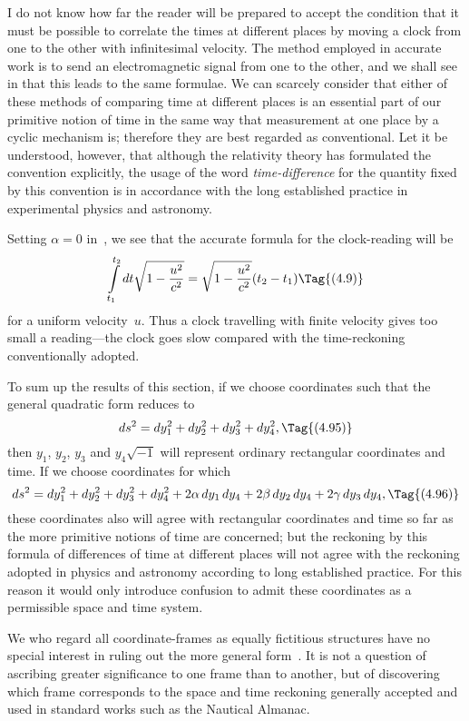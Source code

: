 \documentclass[12pt]{book}
\begin{document}
I do not know how far the reader will be prepared to accept the condition
that it must be possible to correlate the times at different places by moving
a clock from one to the other with infinitesimal velocity. The method
employed in accurate work is to send an electromagnetic signal from one to
the other, and we shall see in  that this leads to the same formulae. We
can scarcely consider that either of these methods of comparing time at
different places is an essential part of our primitive notion of time in the
same way that measurement at one place by a cyclic mechanism is; therefore
they are best regarded as conventional. Let it be understood, however, that
although the relativity theory has formulated the convention explicitly, the
usage of the word \emph{time\hyp{}difference} for the quantity fixed by this convention is
%
in accordance with the long established practice in experimental physics and
astronomy.

Setting $\alpha = 0$ in~, we see that the accurate formula for the clock\hyp{}reading
will be
\[
\int\limits_{t_1}^{t_2} dt \sqrt{1-\frac{u^2}{c^2}} = \sqrt{1-\frac{u^2}{c^2}} (t_2 - t_1)
\Tag{(4.9)}
\]
for a uniform velocity~$u$. Thus a clock travelling with finite velocity gives
too small a reading---the clock goes slow compared with the time\hyp{}reckoning
conventionally adopted.

To sum up the results of this section, if we choose coordinates such that
the general quadratic form reduces to
\[
ds^2 = dy_1^2 + dy_2^2 + dy_3^2 + dy_4^2,
\Tag{(4.95)}
\]
then $y_1$, $y_2$, $y_3$ and $y_4 \sqrt{-1}$ will represent ordinary rectangular coordinates and
time. If we choose coordinates for which
\[
  ds^2 = dy_1^2 + dy_2^2 + dy_3^2 + dy_4^2
  + 2\alpha\, dy_1\, dy_4 + 2\beta\, dy_2\, dy_4 + 2\gamma\, dy_3\, dy_4,
\Tag{(4.96)}
\]
these coordinates also will agree with rectangular coordinates and time so far
as the more primitive notions of time are concerned; but the reckoning by
this formula of differences of time at different places will not agree with the
reckoning adopted in physics and astronomy according to long established
practice. For this reason it would only introduce confusion to admit these
coordinates as a permissible space and time system.

We who regard all coordinate\hyp{}frames as equally fictitious structures have
no special interest in ruling out the more general form~. It is not a
question of ascribing greater significance to one frame than to another, but
of discovering which frame corresponds to the space and time reckoning
generally accepted and used in standard works such as the Nautical Almanac.
\end{document}
